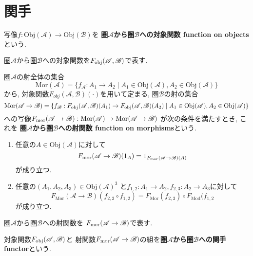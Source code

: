 \section{関手}
\begin{Def}
写像$f:\mathrm{Obj}(\mathscr{A})\rightarrow\mathrm{Obj}(\mathscr{B})$を
{\bf 圏$\mathscr{A}$から圏$\mathscr{B}$への対象関数 function on objects}という.
\end{Def}
\begin{Notation}
圏$\mathscr{A}$から圏$\mathscr{B}$への対象関数を$F_{\rm obj}(\mathscr{A},\mathscr{B})$で表す.
\end{Notation}
\begin{Def}
圏$\mathscr{A}$の射全体の集合\[\mathrm{Mor}(\mathscr{A})=\{f_{\mathscr{A}}:A_1\rightarrow A_2\mid A_1\in\mathrm{Obj}(\mathscr{A}),A_2\in\mathrm{Obj}(\mathscr{A})\}\]
から, 対象関数$F_{obj}(\mathscr{A},\mathscr{B})(\cdot)$を用いて定まる, 圏$\mathscr{B}$の射の集合
\[
\mathrm{Mor}(\mathscr{A}\rightarrow\mathscr{B})=\{f_{\mathscr{B}}:F_{\rm obj}(\mathscr{A},\mathscr{B})(A_1)\rightarrow
F_{\rm obj}(\mathscr{A},\mathscr{B})(A_2)\mid A_1\in\mathrm{Obj}(\mathscr{A}),A_2\in\mathrm{Obj}(\mathscr{A})\}
\]
への写像$F_{\rm mor}(\mathscr{A}\rightarrow\mathscr{B}):\mathrm{Mor}(\mathscr{A})\rightarrow\mathrm{Mor}(\mathscr{A}\rightarrow\mathscr{B})$
が次の条件を満たすとき, これを
{\bf 圏$\mathscr{A}$から圏$\mathscr{B}$への射関数 function on morphisms}という.
\begin{enumerate}
\item 任意の$A\in\mathrm{Obj}(\mathscr{A})$に対して
\[
F_{\rm mor}(\mathscr{A}\rightarrow\mathscr{B})
(1_A)=1_{F_{\rm mor}(\mathscr{A}\rightarrow\mathscr{B})(A)}\]
が成り立つ.
\item 任意の$(A_1,A_2,A_3)\in \mathrm{Obj}(\mathscr{A})^3$
と$f_{1,2}:A_1\rightarrow A_2, f_{2,3}:A_2\rightarrow A_3$に対して
\[
F_{\mathrm{Mor}}(\mathscr{A}\rightarrow\mathscr{B})(f_{2,3}\circ f_{1,2})
=F_{\mathrm{Mor}}(f_{2,3})\circ F_{\mathrm{Mod}}(f_{1,2}
\]
が成り立つ.
\end{enumerate}
\end{Def}
\begin{Notation}
圏$\mathscr{A}$から圏$\mathscr{B}$への射関数を
$F_{\rm mor}(\mathscr{A}\rightarrow\mathscr{B})$で表す.
\end{Notation}
\begin{Def}
対象関数$F_{\rm obj}(\mathscr{A},\mathscr{B})$と
射関数$F_{\rm mor}(\mathscr{A}\rightarrow\mathscr{B})$の組を{\bf 圏$\mathscr{A}$から圏$\mathscr{B}$への関手 functor}という.
\end{Def}
